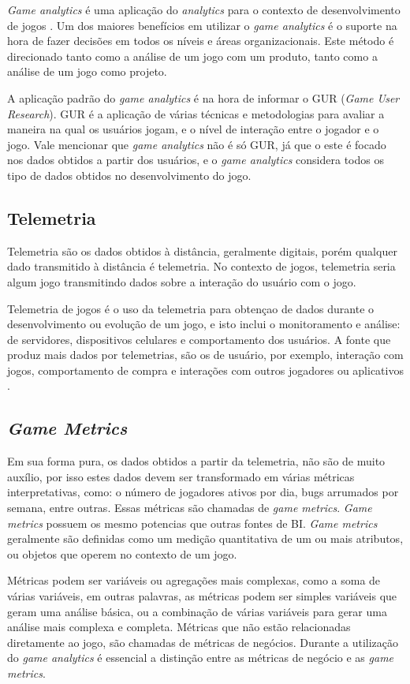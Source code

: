 \textit{Game analytics} é uma aplicação do \textit{analytics} para o contexto de desenvolvimento de jogos \cite{game_analytics}. Um dos maiores benefícios em utilizar o \textit{game analytics} é o suporte na hora de fazer decisões em todos os níveis e áreas organizacionais. Este método é direcionado tanto como a análise de um jogo com um produto, tanto como a análise de um jogo como projeto.

A aplicação padrão do \textit{game analytics} é na hora de informar o GUR (\textit{Game User Research}). GUR é a aplicação de várias técnicas e metodologias para avaliar a maneira na qual os usuários jogam, e o nível de interação entre o jogador e o jogo. Vale mencionar que \textit{game analytics} não é só GUR, já que o este é focado nos dados obtidos a partir dos usuários, e o \textit{game analytics} considera todos os tipo de dados obtidos no desenvolvimento do jogo.
\subsection{Telemetria}
Telemetria são os dados obtidos à distância, geralmente digitais, porém qualquer dado transmitido à distância é telemetria. No contexto de jogos, telemetria seria algum jogo transmitindo dados sobre a interação do usuário com o jogo.

Telemetria de jogos é o uso da telemetria para obtençao de dados durante o desenvolvimento ou evolução de um jogo, e isto inclui o monitoramento e análise: de servidores, dispositivos celulares e comportamento dos usuários. A fonte que produz mais dados por telemetrias, são os de usuário, por exemplo, interação com jogos, comportamento de compra e interações com outros jogadores ou aplicativos \cite{telemetry}.
\subsection{\textit{Game Metrics}}
Em sua forma pura, os dados obtidos a partir da telemetria, não são de muito auxílio, por isso estes dados devem ser transformado em várias métricas interpretativas, como: o número de jogadores ativos por dia, bugs arrumados por semana, entre outras. Essas métricas são chamadas de \textit{game metrics}. \textit{Game metrics} possuem os mesmo potencias que outras fontes de BI. \textit{Game metrics} geralmente são definidas como um medição quantitativa de um ou mais atributos, ou objetos que operem no contexto de um jogo.

Métricas podem ser variáveis ou  agregações mais complexas, como a soma de várias variáveis, em outras palavras, as métricas podem ser simples variáveis que geram uma análise básica, ou a combinação de várias variáveis para gerar uma análise mais complexa e completa. Métricas que não estão relacionadas diretamente ao jogo, são chamadas de métricas de negócios. Durante a utilização do \textit{game analytics} é essencial a distinção entre as métricas de negócio e as \textit{game metrics}.

